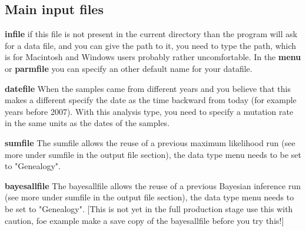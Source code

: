 \subsection{Main input files}
\begin{description}
\item{\bf infile} if this file is not present in the current directory 
than the program will ask for a data file, and you can
give the path to it, you need to type the path, which is for Macintosh and Windows users probably rather uncomfortable. In the {\bf menu} or {\bf parmfile} you can specify an other default name for your datafile. 
\item{\bf datefile} When the samples came from different years and you believe that this makes a different specify the date as the time backward from today (for example years before 2007). With this analysis type, you need to specify a mutation rate in the same units as the dates of the samples.
\item{\bf sumfile} The sumfile allows the reuse of a previous maximum likelihood run (see more under sumfile in the output file section), the data type menu needs to be set to "Genealogy".
\item{\bf bayesallfile} The bayesallfile allows the reuse of a previous Bayesian inference run (see more under sumfile in the output file section), the data type menu needs to be set to "Genealogy". [This is not yet in the full production stage use this with caution, foe example make a save copy of the bayesallfile  before you try this!]
\end{description}
